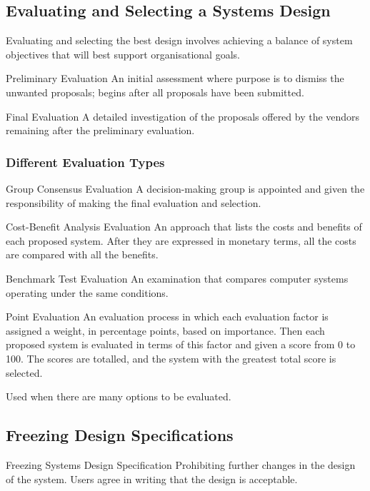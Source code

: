 \documentclass[\main/notes.tex]{subfiles}
\begin{document}
			\subsection{Evaluating and Selecting a Systems Design}
				Evaluating and selecting the best design involves achieving a balance of system objectives that will best support organisational goals.
				\begin{definition}{Preliminary Evaluation}
					An initial assessment where purpose is to dismiss the unwanted proposals; begins after all proposals have been submitted.
				\end{definition}
				\begin{definition}{Final Evaluation}
					A detailed investigation of the proposals offered by the vendors remaining after the preliminary evaluation.
				\end{definition}
				\subsubsection{Different Evaluation Types}
					\begin{definition}{Group Consensus Evaluation}
						A decision-making group is appointed and given the responsibility of making the final evaluation and selection.
					\end{definition}
					\begin{definition}{Cost-Benefit Analysis Evaluation}
						An approach that lists the costs and benefits of each proposed system. After they are expressed in monetary terms, all the costs are compared with all the benefits.
					\end{definition}
					\begin{definition}{Benchmark Test Evaluation}
						An examination that compares computer systems operating under the same conditions.
					\end{definition}
					\begin{definition}{Point Evaluation}
						An evaluation process in which each evaluation factor is assigned a weight, in percentage points, based on importance. Then each proposed system is evaluated in terms of this factor and given a score from 0 to 100. The scores are totalled, and the system with the greatest total score is selected.

						Used when there are many options to be evaluated.
					\end{definition}
			\subsection{Freezing Design Specifications}
				\begin{definition}{Freezing Systems Design Specification}
					Prohibiting further changes in the design of the system. Users agree in writing that the design is acceptable.
				\end{definition}
\end{document}
